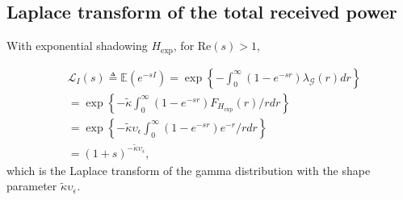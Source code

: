 \documentclass[lettersize,journal]{IEEEtran}
\begin{document}



\subsection{Laplace transform of the total received power}

With exponential shadowing ${H}_{\text{exp}}$, for Re$(s)>1$,

\begin{align}
  \label{eq:lapdef}
  &\mathcal{L}_{I}(s)\triangleq \mathbb{E}\left(e^{-sI}\right)= \exp\left\{-\int_0^{\infty}(1-e^{-sr}) \lambda_{\mathcal{G}}(r) dr \right\} \nonumber \\
  &=\exp\left\{-\tilde{\kappa}\int_0^{\infty}(1-e^{-sr}) F_{{H}_{\text{exp}}}(r) /r dr \right\} \nonumber \\
  &=\exp\left\{-\tilde{\kappa}\upsilon_{\epsilon}\int_0^{\infty}(1-e^{-sr}) e^{-r} /r dr \right\} \nonumber \\
  &=(1+s)^{-\tilde{\kappa}\upsilon_{\epsilon}},
\end{align}
which is the Laplace transform of the gamma distribution with the shape parameter $\tilde{\kappa}\upsilon_{\epsilon}$. 
\end{document}
